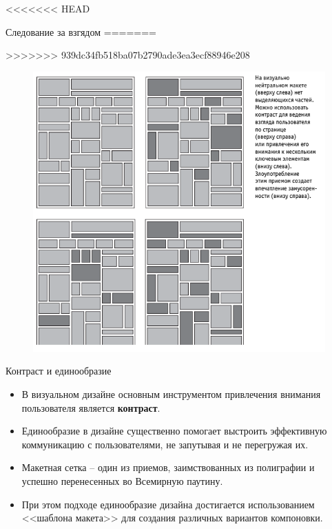 \documentclass{beamer}
\begin{document}
<<<<<<< HEAD
\begin{frame}[t]{Следование за взгядом}
=======
\begin{frame}[t]
>>>>>>> 939dc34fb518ba07b2790ade3ea3ecf88946e208
	\begin{figure}[h]
		\centering
		\includegraphics[scale=0.5]{images/lec05-pic02.png}
	\end{figure}
\end{frame}  

\begin{frame}[t]{Контраст и единообразие}
	\begin{itemize}
		\item В визуальном дизайне основным инструментом привлечения внимания пользователя является \textbf{контраст}.

		\item Единообразие в дизайне существенно помогает выстроить эффективную коммуникацию с пользователями, не запутывая и не перегружая их.

		\item Макетная сетка – один из приемов, заимствованных из полиграфии и успешно перенесенных во Всемирную паутину. 

		\item При этом подходе единообразие дизайна достигается использованием <<шаблона макета>> для создания различных вариантов компоновки.
	\end{itemize}
\end{frame}


\end{frame}
\end{document}
